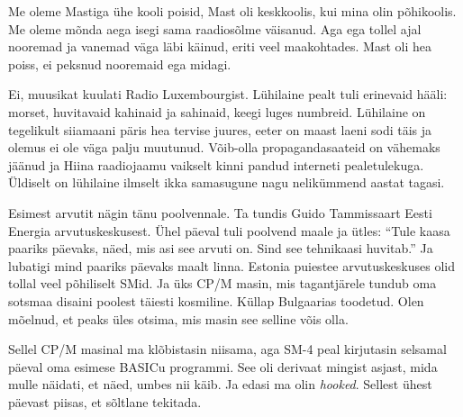 
Me oleme Mastiga ühe kooli poisid, Mast oli keskkoolis, kui mina olin 
põhikoolis. Me oleme mõnda aega isegi sama 
raadiosõlme väisanud. Aga ega tollel ajal nooremad ja vanemad väga läbi käinud, 
eriti veel 
maakohtades. Mast oli hea 
poiss, ei peksnud nooremaid ega midagi. 


Ei, muusikat kuulati Radio Luxembourgist. Lühilaine pealt tuli erinevaid 
hääli: morset, huvitavaid kahinaid ja sahinaid, keegi 
luges numbreid. Lühilaine on tegelikult siiamaani päris hea tervise 
juures, eeter on maast laeni sodi täis ja olemus 
ei ole väga palju muutunud. Võib-olla propagandasaateid on vähemaks 
jäänud ja Hiina raadiojaamu vaikselt kinni pandud  
interneti pealetulekuga. Üldiselt on lühilaine ilmselt ikka samasugune nagu 
nelikümmend aastat tagasi.


Esimest arvutit nägin tänu poolvennale. Ta tundis Guido 
Tammissaart Eesti Energia 
arvutuskeskusest. Ühel 
päeval tuli poolvend maale ja ütles: \enquote{Tule kaasa paariks päevaks, näed, 
mis asi 
see arvuti on. Sind see tehnikaasi huvitab.} Ja lubatigi mind paariks päevaks 
maalt 
linna. Estonia puiestee arvutuskeskuses olid tollal veel põhiliselt 
SMid. Ja 
üks CP/M 
masin, mis tagantjärele tundub oma sotsmaa disaini poolest täiesti kosmiline. 
Küllap Bulgaarias toodetud. Olen mõelnud, et 
peaks üles otsima, mis masin see selline võis olla. 

Sellel CP/M masinal ma klõbistasin niisama, aga 
SM-4 peal 
kirjutasin selsamal päeval oma esimese BASICu programmi. 
See oli derivaat mingist asjast, mida mulle näidati, et näed, umbes nii 
käib. Ja edasi ma olin \emph{hooked}. Sellest ühest päevast piisas, et sõltlane 
tekitada. 


